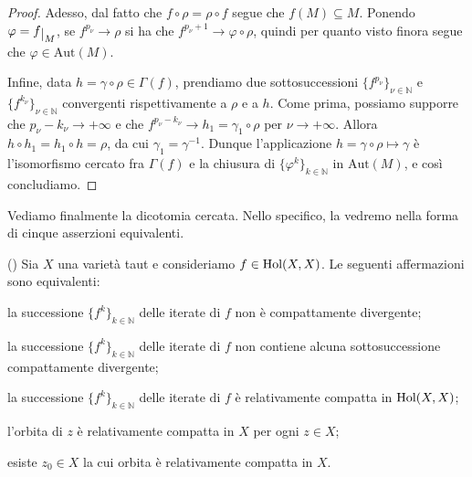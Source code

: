 \begin{proof}
    Adesso, dal fatto che $f\circ\rho=\rho\circ f$ segue che $f(M)\subseteq M$. Ponendo $\varphi=f\restrict{M}$, se $f^{p_\nu}\longrightarrow\rho$ si ha che $f^{p_\nu+1}\longrightarrow\varphi\circ\rho$, quindi per quanto visto finora segue che $\varphi\in\text{Aut}(M)$.

    Infine, data $h=\gamma\circ\rho\in\Gamma(f)$, prendiamo due sottosuccessioni $\{f^{p_\nu}\}_{\nu\in\mathbb{N}}$ e $\{f^{k_\nu}\}_{\nu\in\mathbb{N}}$ convergenti rispettivamente a $\rho$ e a $h$. Come prima, possiamo supporre che $p_\nu-k_\nu \longrightarrow+\infty$ e che $f^{p_\nu-k_\nu} \longrightarrow h_1=\gamma_1\circ\rho$ per $\nu\longrightarrow+\infty$. Allora $h\circ h_1=h_1\circ h=\rho$, da cui $\gamma_1=\gamma^{-1}$. Dunque l'applicazione $h=\gamma\circ\rho\longmapsto\gamma$ è l'isomorfismo cercato fra $\Gamma(f)$ e la chiusura di $\{\varphi^k\}_{k\in\mathbb{N}}$ in $\text{Aut}(M)$, e così concludiamo.
\end{proof}

Vediamo finalmente la dicotomia cercata. Nello specifico, la vedremo nella forma di cinque asserzioni equivalenti.

\begin{thm} \label{dicotomia}
    (\cite[Theorem 1.1]{A2}) Sia $X$ una varietà taut e consideriamo $f \in \textnormal{Hol}(X,X)$. Le seguenti affermazioni sono equivalenti:
    \begin{nlist}
        \item la successione $\{f^k\}_{k \in \mathbb{N}}$ delle iterate di $f$ non è compattamente divergente;
        \item la successione $\{f^k\}_{k \in \mathbb{N}}$ delle iterate di $f$ non contiene alcuna sottosuccessione compattamente divergente;
        \item la successione $\{f^k\}_{k \in \mathbb{N}}$ delle iterate di $f$ è relativamente compatta in $\textnormal{Hol}(X,X)$;
        \item l'orbita di $z$ è relativamente compatta in $X$ per ogni $z \in X$;
        \item esiste $z_0 \in X$ la cui orbita è relativamente compatta in $X$.
    \end{nlist}
\end{thm}

